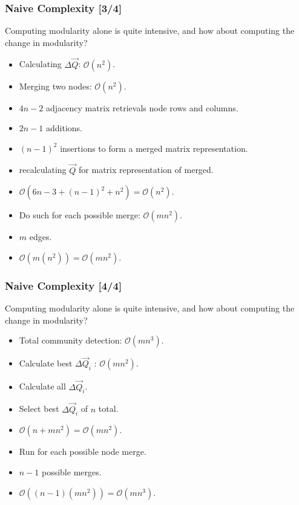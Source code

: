 \documentclass{beamer}
\begin{document}
\begin{frame}

    \frametitle{Naive Complexity [3/4]}

    Computing modularity alone is quite intensive, and how about computing the change in modularity?\pause

    \vspace{2.5mm}
    \begin{itemize}
        \item Calculating $ \Delta \vec{Q} $: $ \mathcal{O}(n^{2}) $.\pause
        \item[$\diamond$] Merging two nodes: $ \mathcal{O}(n^{2}) $.\pause
        \item[$\ast$] $ 4n - 2 $ adjacency matrix retrievals node rows and columns.\pause
        \item[$\ast$] $ 2n - 1 $ additions.\pause
        \item[$\ast$] $ (n - 1)^{2} $ insertions to form a merged matrix representation.\pause
        \item[$\ast$] recalculating $ \vec{Q} $ for matrix representation of merged.\pause
        \item[$\ast$] $ \mathcal{O}(6n -3 + (n - 1)^{2} + n^{2}) = \mathcal{O}(n^{2}) $.\pause
        \item[$\diamond$] Do such for each possible merge: $ \mathcal{O}(mn^{2}) $.\pause
        \item[$\ast$] $ m $ edges.\pause
        \item[$\ast$] $ \mathcal{O}(m(n^{2})) = \mathcal{O}(mn^{2}) $.
    \end{itemize}

\end{frame}

\begin{frame}

    \frametitle{Naive Complexity [4/4]}

    Computing modularity alone is quite intensive, and how about computing the change in modularity?\pause

    \vspace{2.5mm}
    \begin{itemize}
        \item Total community detection: $ \mathcal{O}(mn^{3}) $.\pause
        \item[$\diamond$] Calculate best $ \Delta \vec{Q}_{i} $ : $\mathcal{O}(mn^{2}) $.\pause
        \item[$\ast$] Calculate all $ \Delta \vec{Q}_{i} $.\pause
        \item[$\ast$] Select best $ \Delta \vec{Q}_{i} $ of $ n $ total.\pause
        \item[$\ast$] $ \mathcal{O}(n + mn^{2}) = \mathcal{O}(mn^{2}) $.\pause
        \item[$\diamond$] Run for each possible node merge.\pause
        \item[$\ast$] $ n - 1 $ possible merges.\pause
        \item[$\ast$] $ \mathcal{O}((n - 1)(mn^{2})) = \mathcal{O}(mn^{3}) $.
    \end{itemize}

\end{frame}
\end{document}
